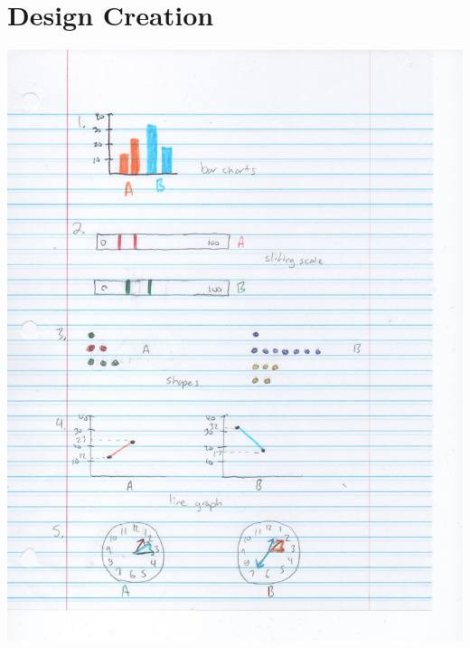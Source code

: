 \documentclass[11pt]{article}
\begin{document}
\section*{Design Creation}

\includegraphics[scale=0.15]{Scan4}
\end{document}
